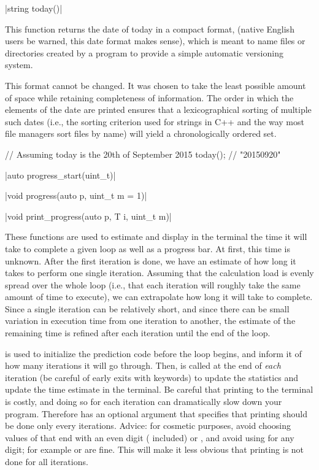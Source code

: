 \funcitem \cppinline|string today()| 

This function returns the date of today in a compact format,  (native English users be warned, this date format makes sense), which is meant to name files or directories created by a program to provide a simple automatic versioning system.

This format cannot be changed. It was chosen to take the least possible amount of space while retaining completeness of information. The order in which the elements of the date are printed ensures that a lexicographical sorting of multiple such dates (i.e., the sorting criterion used for strings in C++ and the way most file managers sort files by name) will yield a chronologically ordered set.

\begin{example}
\begin{cppcode}
// Assuming today is the 20th of September 2015
today(); // "20150920"
\end{cppcode}
\end{example}

\funcitem \cppinline|auto progress_start(uint_t)| 

\cppinline|void progress(auto p, uint_t m = 1)| 

\cppinline|void print_progress(auto p, T i, uint_t m)| 

These functions are used to estimate and display in the terminal the time it will take to complete a given loop as well as a progress bar. At first, this time is unknown. After the first iteration is done, we have an estimate of how long it takes to perform one single iteration. Assuming that the calculation load is evenly spread over the whole loop (i.e., that each iteration will roughly take the same amount of time to execute), we can extrapolate how long it will take to complete. Since a single iteration can be relatively short, and since there can be small variation in execution time from one iteration to another, the estimate of the remaining time is refined after each iteration until the end of the loop.

 is used to initialize the prediction code before the loop begins, and inform it of how many iterations it will go through. Then,  is called at the end of \emph{each} iteration (be careful of early exits with  keywords) to update the statistics and update the time estimate in the terminal. Be careful that printing to the terminal is costly, and doing so for each iteration can dramatically slow down your program. Therefore  has an optional argument  that specifies that printing should be done only every  iterations. Advice: for cosmetic purposes, avoid choosing values of  that end with an even digit ( included) or , and avoid using  for any digit; for example  or  are fine. This will make it less obvious that printing is not done for all iterations.


